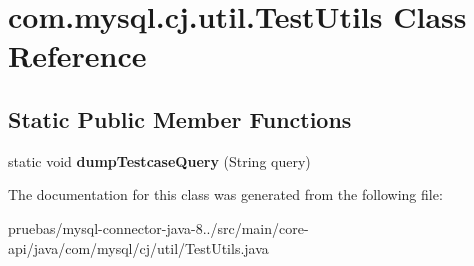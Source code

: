 \hypertarget{classcom_1_1mysql_1_1cj_1_1util_1_1_test_utils}{}\section{com.\+mysql.\+cj.\+util.\+Test\+Utils Class Reference}
\label{classcom_1_1mysql_1_1cj_1_1util_1_1_test_utils}
\subsection*{Static Public Member Functions}
\begin{DoxyCompactItemize}
\item 
\mbox{\label{classcom_1_1mysql_1_1cj_1_1util_1_1_test_utils_a5922a7ed071bc09b6b3e837ee8c33cbb}} 
static void {\bfseries dump\+Testcase\+Query} (String query)
\end{DoxyCompactItemize}


The documentation for this class was generated from the following file\+:\begin{DoxyCompactItemize}
\item 
pruebas/mysql-\/connector-\/java-\/8../src/main/core-\/api/java/com/mysql/cj/util/Test\+Utils.\+java\end{DoxyCompactItemize}
